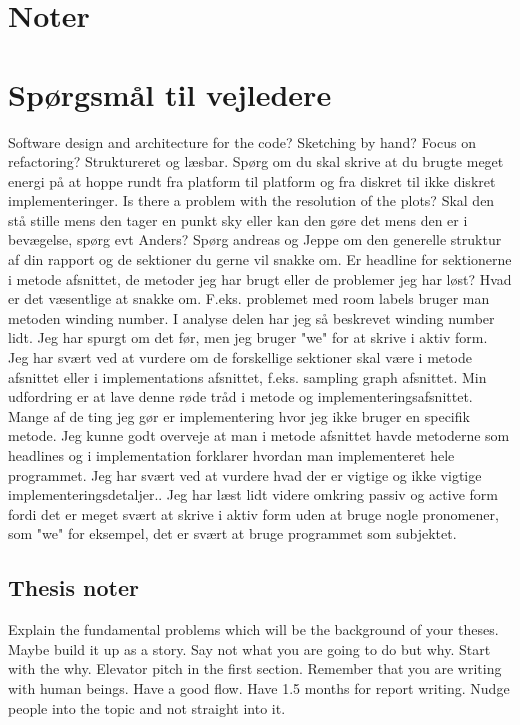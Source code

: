 \section{Noter}
\section{Spørgsmål til vejledere}
Software design and architecture for the code?
Sketching by hand?
Focus on refactoring? Struktureret og læsbar.
Spørg om du skal skrive at du brugte meget energi på at hoppe rundt fra platform til platform og fra diskret til ikke diskret implementeringer.
Is there a problem with the resolution of the plots?
Skal den stå stille mens den tager en punkt sky eller kan den gøre det mens den er i bevægelse, spørg evt Anders?
Spørg andreas og Jeppe om den generelle struktur af din rapport og de sektioner du gerne vil snakke om.
Er headline for sektionerne i metode afsnittet, de metoder jeg har brugt eller de problemer jeg har løst? Hvad er det væsentlige at snakke om. 
F.eks. problemet med room labels bruger man metoden winding number. I analyse delen har jeg så beskrevet winding number lidt.
Jeg har spurgt om det før, men jeg bruger "we" for at skrive i aktiv form.
Jeg har svært ved at vurdere om de forskellige sektioner skal være i metode afsnittet eller i implementations afsnittet, f.eks. sampling graph afsnittet.
Min udfordring er at lave denne røde tråd i metode og implementeringsafsnittet. Mange af de ting jeg gør er implementering hvor jeg ikke bruger en specifik metode. Jeg kunne godt overveje at man i metode afsnittet havde metoderne som headlines og i implementation forklarer hvordan man implementeret hele programmet. Jeg har svært ved at vurdere hvad der er vigtige og ikke vigtige implementeringsdetaljer..
Jeg har læst lidt videre omkring passiv og active form fordi det er meget svært at skrive i aktiv form uden at bruge nogle pronomener, som "we" for eksempel, det er svært at bruge programmet som subjektet.
 
\subsection{Thesis noter}
Explain the fundamental problems which will be the background of your theses.
Maybe build it up as a story.
Say not what you are going to do but why.
Start with the why. Elevator pitch in the first section.
Remember that you are writing with human beings. Have a good flow. Have 1.5 months for report writing.
Nudge people into the topic and not straight into it.

